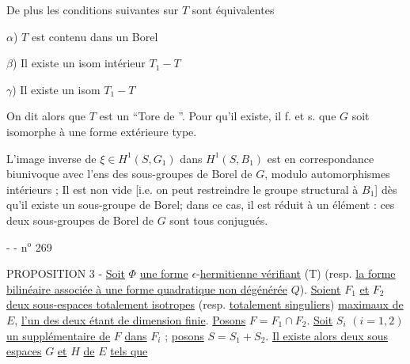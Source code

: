 \margin{$W_1$ et $W$ sont \unsure{commutants} l'un de l'autre \unsure{dans cet ens} $P_1$ \unsure{supposé} \unsure{principal} \unsure{lorsque les deux schémas sont} $\ne\phi$]}

De plus les conditions suivantes sur $T$ sont équivalentes

$\alpha$) $T$ est contenu dans un Borel

$\beta$) Il existe un isom intérieur $T_1-T$

$\gamma$) Il existe un isom  $T_1-T$

On dit alors que $T$ est un ``Tore de ''. Pour qu'il existe, il f. et s. que $G$ soit isomorphe à une forme extérieure type.

L'image inverse de $\xi\in H^1(S,G_1)$ dans $H^1(S,B_1)$ est en correspondance biunivoque avec l'ens des sous-groupes de Borel de $G$, modulo automorphismes intérieurs ; Il est non vide [i.e. on peut restreindre le groupe structural à $B_1$] dès qu'il existe un sous-groupe de Borel; dans ce cas, il est réduit à un élément :  ces deux sous-groupes de Borel de $G$ sont tous conjugués. 


\margin{$\times$}
-  - \hfill n$^{\mathrm{o}}$ 269

PROPOSITION 3 - \uline{Soit} $\Phi$ \uline{une forme} $\epsilon$-\uline{hermitienne vérifiant} (T) (resp. \uline{la forme bilinéaire associée à une forme quadratique non dégénérée} $Q$). \uline{Soient} $F_1$ \uline{et} $F_2$ \uline{deux sous-espaces totalement isotropes} (resp. \uline{totalement singuliers}) \uline{maximaux de} $E$, \uline{l'un des deux étant de dimension finie}. \uline{Posons} $F=F_1\cap F_2$. \uline{Soit} $S_i$ $(i=1,2)$ \uline{un supplémentaire de} $F$ \uline{dans} $F_i$ ; \uline{posons} $S=S_1+S_2$. \uline{Il existe alors deux sous espaces} $G$ \uline{et} $H$ \uline{de} $E$ \uline{tels que}


